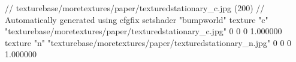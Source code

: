 // texturebase/moretextures/paper/texturedstationary_c.jpg (200)
// Automatically generated using cfgfix
setshader "bumpworld"
texture "c" "texturebase/moretextures/paper/texturedstationary_c.jpg" 0 0 0 1.000000
texture "n" "texturebase/moretextures/paper/texturedstationary_n.jpg" 0 0 0 1.000000
